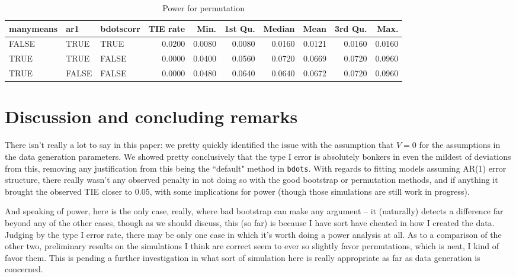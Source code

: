 \documentclass{article}
\newcommand{\xt}{\texttt}
\begin{document}
\begin{table}[ht]
\centering
\begin{tabular}{lllrrrrrrr}
  \hline
manymeans & ar1 & bdotscorr & TIE rate & Min. & 1st Qu. & Median & Mean & 3rd Qu. & Max. \\ 
  \hline
FALSE & TRUE & TRUE & 0.0200 & 0.0080 & 0.0080 & 0.0160 & 0.0121 & 0.0160 & 0.0160 \\ 
  TRUE & TRUE & FALSE & 0.0000 & 0.0400 & 0.0560 & 0.0720 & 0.0669 & 0.0720 & 0.0960 \\ 
  TRUE & FALSE & FALSE & 0.0000 & 0.0480 & 0.0640 & 0.0640 & 0.0672 & 0.0720 & 0.0960 \\ 
   \hline
\end{tabular}
\caption{Power for permutation} 
\label{tab:perm_pwr2}
\end{table}

\section{Discussion and concluding remarks}

There isn't really a lot to say in this paper: we pretty quickly identified the issue with the assumption that $V = 0$ for the assumptions in the data generation parameters. We showed pretty conclusively that the type I error is absolutely bonkers in even the mildest of deviations from this, removing any justification from this being the ``default" method in \xt{bdots}. With regards to fitting models assuming AR(1) error structure, there really wasn't any observed penalty in not doing so with the good bootstrap or permutation methods, and if anything it brought the observed TIE closer to 0.05, with some implications for power (though those simulations are still work in progress).

And speaking of power, here is the only case, really, where bad bootstrap can make any argument -- it (naturally) detects a difference far beyond any of the other cases, though as we should discuss, this (so far) is because I have sort have cheated in how I created the data. Judging by the type I error rate, there may be only one case in which it's worth doing a power analysis at all. As to a comparison of the other two, preliminary results on the simulations I think are correct seem to ever so slightly favor permutations, which is neat, I kind of favor them. This is pending a further investigation in what sort of simulation here is really appropriate as far as data generation is concerned.
\end{document}
